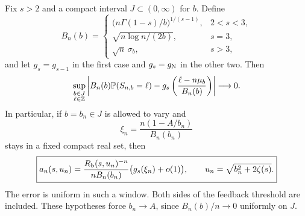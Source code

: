\begin{theorem}
\label{thm:coefficient-crossover}
Fix $s>2$ and a compact interval $J\subset(0,\infty)$ for $b$.
Define
\begin{equation}\label{eq:scales}
 B_n(b)=
 \begin{cases}
  \bigl(n\Gamma(1-s)/b\bigr)^{1/(s-1)},&2<s<3,\\[3pt]
  \sqrt{n\log n/(2b)},&s=3,\\[3pt]
  \sqrt n\,\sigma_b,&s>3,
 \end{cases}
\end{equation}
and let $g_s=g_{s-1}$ in the first case and $g_s=g_{\rm N}$ in
the other two.  Then
\begin{equation}\label{eq:uniform-llt}
 \sup_{\substack{b\in J\\\ell\in\mathbb Z}}
 \left|B_n(b)\mathbb P(S_{n,b}=\ell)
  -g_s\left(\frac{\ell-n\mu_b}{B_n(b)}\right)\right|
 \longrightarrow0.
\end{equation}
In particular, if $b=b_n\in J$ is allowed to vary and
\begin{equation}\label{eq:xi}
 \xi_n=\frac{n(1-A/b_n)}{B_n(b_n)}
\end{equation}
stays in a fixed compact real set, then
\begin{equation}\label{eq:crossover-coefficient}
 \boxed{\displaystyle
 a_n(s,u_n)=\frac{R_{\mathrm b}(s,u_n)^{-n}}{nB_n(b_n)}
   \bigl(g_s(\xi_n)+o(1)\bigr),\qquad
 u_n=\sqrt{b_n^2+2\zeta(s)}.}
\end{equation}
The error is uniform in such a window.  Both sides of the feedback
threshold are included.  These hypotheses force $b_n\to A$, since
$B_n(b)/n\to0$ uniformly on $J$.
\end{theorem}

